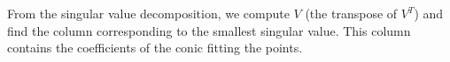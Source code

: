 \begin{problem}
\begin{enumalph}
\begin{answer}
        \step
        From the singular value decomposition, we compute $V$
        (the transpose of $V^T$) and find the column corresponding
        to the smallest singular value.
        This column contains the coefficients of the conic
        fitting the points.







\end{answer}
\end{enumalph}
\end{problem}
